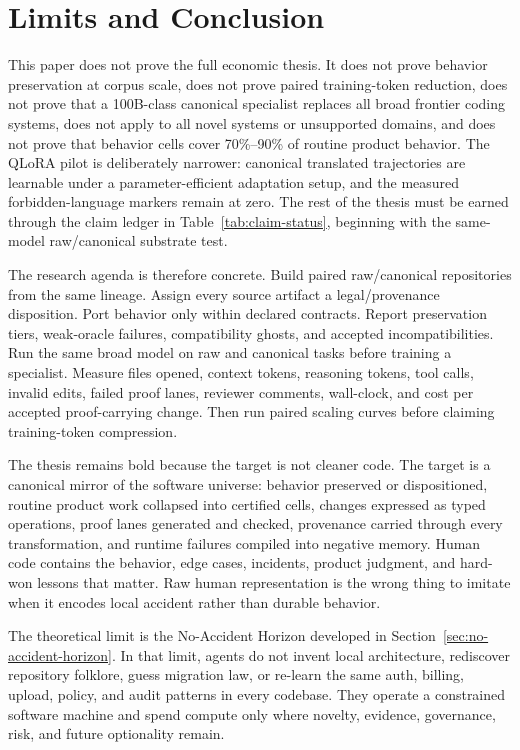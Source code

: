 \section{Limits and Conclusion}

This paper does not prove the full economic thesis. It does not prove behavior preservation at corpus scale, does not prove paired training-token reduction, does not prove that a 100B-class canonical specialist replaces all broad frontier coding systems, does not apply to all novel systems or unsupported domains, and does not prove that behavior cells cover 70\%--90\% of routine product behavior. The QLoRA pilot is deliberately narrower: canonical translated trajectories are learnable under a parameter-efficient adaptation setup, and the measured forbidden-language markers remain at zero. The rest of the thesis must be earned through the claim ledger in Table~\ref{tab:claim-status}, beginning with the same-model raw/canonical substrate test.

The research agenda is therefore concrete. Build paired raw/canonical repositories from the same lineage. Assign every source artifact a legal/provenance disposition. Port behavior only within declared contracts. Report preservation tiers, weak-oracle failures, compatibility ghosts, and accepted incompatibilities. Run the same broad model on raw and canonical tasks before training a specialist. Measure files opened, context tokens, reasoning tokens, tool calls, invalid edits, failed proof lanes, reviewer comments, wall-clock, and cost per accepted proof-carrying change. Then run paired scaling curves before claiming training-token compression.

The thesis remains bold because the target is not cleaner code. The target is a canonical mirror of the software universe: behavior preserved or dispositioned, routine product work collapsed into certified cells, changes expressed as typed operations, proof lanes generated and checked, provenance carried through every transformation, and runtime failures compiled into negative memory. Human code contains the behavior, edge cases, incidents, product judgment, and hard-won lessons that matter. Raw human representation is the wrong thing to imitate when it encodes local accident rather than durable behavior.

The theoretical limit is the No-Accident Horizon developed in Section~\ref{sec:no-accident-horizon}. In that limit, agents do not invent local architecture, rediscover repository folklore, guess migration law, or re-learn the same auth, billing, upload, policy, and audit patterns in every codebase. They operate a constrained software machine and spend compute only where novelty, evidence, governance, risk, and future optionality remain.


